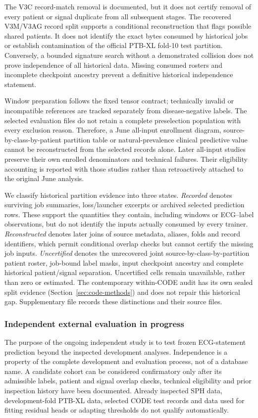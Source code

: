 The V3C record-match removal is documented, but it does not certify removal of every patient or signal duplicate from all subsequent stages. The recovered V3M/V3AG record split supports a conditional reconstruction that flags possible shared patients. It does not identify the exact bytes consumed by historical jobs or establish contamination of the official PTB-XL fold-10 test partition. Conversely, a bounded signature search without a demonstrated collision does not prove independence of all historical data. Missing consumed rosters and incomplete checkpoint ancestry prevent a definitive historical independence statement.

Window preparation follows the fixed tensor contract; technically invalid or incompatible references are tracked separately from disease-negative labels. The selected evaluation files do not retain a complete preselection population with every exclusion reason. Therefore, a June all-input enrollment diagram, source-by-class-by-patient partition table or natural-prevalence clinical predictive value cannot be reconstructed from the selected records alone. Later all-input studies preserve their own enrolled denominators and technical failures. Their eligibility accounting is reported with those studies rather than retroactively attached to the original June analysis.

We classify historical partition evidence into three states. \emph{Recorded} denotes surviving job summaries, loss/launcher excerpts or archived selected prediction rows. These support the quantities they contain, including windows or ECG--label observations, but do not identify the inputs actually consumed by every trainer. \emph{Reconstructed} denotes later joins of source metadata, aliases, folds and record identifiers, which permit conditional overlap checks but cannot certify the missing job inputs. \emph{Uncertified} denotes the unrecovered joint source-by-class-by-partition patient roster, job-bound label masks, input checkpoint ancestry and complete historical patient/signal separation. Uncertified cells remain unavailable, rather than zero or estimated. The contemporary within-CODE audit has its own sealed split evidence (Section~\ref{sec:code-methods}) and does not repair this historical gap. Supplementary file  records these distinctions and their source files.

\subsubsection{Independent external evaluation in progress}
\label{sec:external-plan}
The purpose of the ongoing independent study is to test frozen ECG-statement prediction beyond the inspected development analyses. Independence is a property of the complete development and evaluation process, not of a database name. A candidate cohort can be considered confirmatory only after its admissible labels, patient and signal overlap checks, technical eligibility and prior inspection history have been documented. Already inspected SPH data, development-fold PTB-XL data, selected CODE test records and data used for fitting residual heads or adapting thresholds do not qualify automatically.

